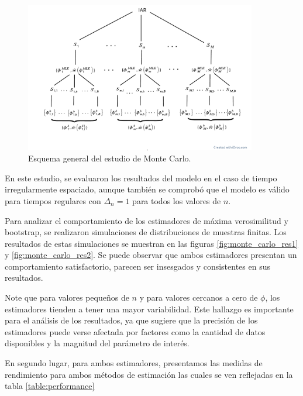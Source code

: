 \begin{figure}[h]
    \includegraphics[trim={0 2cm 0 0},clip,width=0.9\textwidth]{Kap3/Fig_Cap3/4RzQZ8xYXY.pdf}
    \caption{Esquema general del estudio de Monte Carlo.}
    \label{fig:monte_carlo1}
\end{figure}

En este estudio, se evaluaron los resultados del modelo en el caso de tiempo irregularmente espaciado, aunque también se comprobó que el modelo es válido para tiempos regulares con $\Delta_n=1$ para todos los valores de $n$.

Para analizar el comportamiento de los estimadores de máxima verosimilitud y bootstrap, 
se realizaron simulaciones de distribuciones de muestras finitas.
Los resultados de estas simulaciones se muestran en las figuras \ref{fig:monte_carlo_res1} y \ref{fig:monte_carlo_res2}. 
Se puede observar que ambos estimadores presentan un comportamiento satisfactorio, parecen ser insesgados y consistentes en sus resultados.

Note que para valores pequeños de $n$ y para valores cercanos a cero de $\phi$, 
los estimadores tienden a tener una mayor variabilidad.
Este hallazgo es importante para el análisis de los resultados, 
ya que sugiere que la precisión de los estimadores puede verse afectada por factores como la cantidad de datos 
disponibles y la magnitud del parámetro de interés.

En segundo lugar, para ambos estimadores, presentamos las medidas de rendimiento para ambos métodos de estimación
las cuales se ven reflejadas en la tabla \ref{table:performance}

